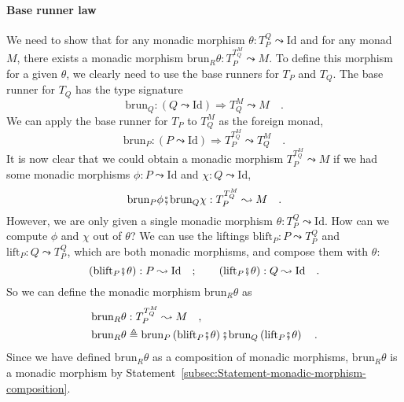\paragraph{Base runner law}

We need to show that for any monadic morphism $\theta:T_{P}^{Q}\leadsto\text{Id}$
and for any monad $M$, there exists a monadic morphism $\text{brun}_{R}\theta:T_{P}^{T_{Q}^{M}}\leadsto M$.
To define this morphism for a given $\theta$, we clearly need to
use the base runners for $T_{P}$ and $T_{Q}$. The base runner for
$T_{Q}$ has the type signature
\[
\text{brun}_{Q}:\left(Q\leadsto\text{Id}\right)\Rightarrow T_{Q}^{M}\leadsto M\quad.
\]
We can apply the base runner for $T_{P}$ to $T_{Q}^{M}$ as the foreign
monad,
\[
\text{brun}_{P}:\left(P\leadsto\text{Id}\right)\Rightarrow T_{P}^{T_{Q}^{M}}\leadsto T_{Q}^{M}\quad.
\]
It is now clear that we could obtain a monadic morphism $T_{P}^{T_{Q}^{M}}\leadsto M$
if we had some monadic morphisms $\phi:P\leadsto\text{Id}$ and $\chi:Q\leadsto\text{Id}$,
\[
\text{brun}_{P}\phi\bef\text{brun}_{Q}\chi:T_{P}^{T_{Q}^{M}}\leadsto M\quad.
\]
However, we are only given a single monadic morphism $\theta:T_{P}^{Q}\leadsto\text{Id}$.
How can we compute $\phi$ and $\chi$ out of $\theta$? We can use
the liftings $\text{blift}_{P}:P\leadsto T_{P}^{Q}$ and $\text{lift}_{P}:Q\leadsto T_{P}^{Q}$,
which are both monadic morphisms, and compose them with $\theta$:
\[
\left(\text{blift}_{P}\bef\theta\right):P\leadsto\text{Id}\quad;\quad\quad\left(\text{lift}_{P}\bef\theta\right):Q\leadsto\text{Id}\quad.
\]
So we can define the monadic morphism $\text{brun}_{R}\theta$ as
\begin{align*}
\text{brun}_{R}\theta & :T_{P}^{T_{Q}^{M}}\leadsto M\quad,\\
\text{brun}_{R}\theta & \triangleq\text{brun}_{P}\left(\text{blift}_{P}\bef\theta\right)\bef\text{brun}_{Q}\left(\text{lift}_{P}\bef\theta\right)\quad.
\end{align*}
Since we have defined $\text{brun}_{R}\theta$ as a composition of
monadic morphisms, $\text{brun}_{R}\theta$ is a monadic morphism
by Statement~\ref{subsec:Statement-monadic-morphism-composition}.


